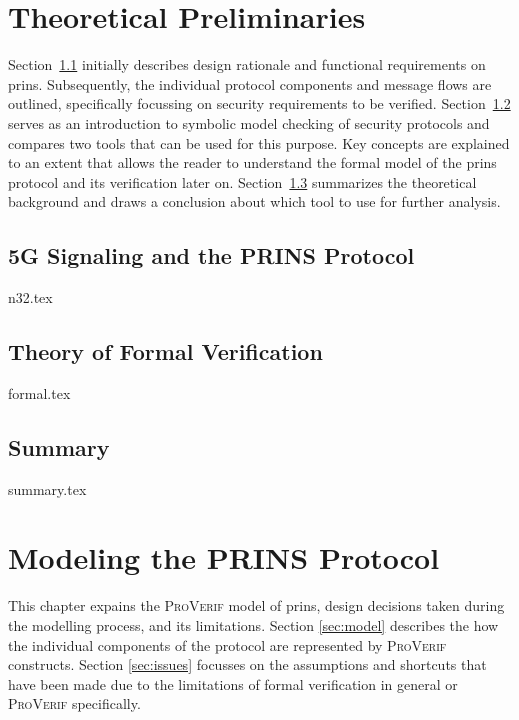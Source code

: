 \documentclass[a4paper,12pt,twoside]{report}
\begin{document}
\clearpage

\chapter{Theoretical Preliminaries}
\label{chap:theory}

Section~\ref{sec:n32} initially describes design rationale and functional requirements on \gls{prins}.
Subsequently, the individual protocol components and message flows are outlined, specifically focussing on security requirements to be verified.
Section~\ref{sec:formal} serves as an introduction to symbolic model checking of security protocols and compares two tools that can be used for this purpose.
Key concepts are explained to an extent that allows the reader to understand the formal model of the \gls{prins} protocol and its verification later on.
Section~\ref{sec:summary} summarizes the theoretical background and draws a conclusion about which tool to use for further analysis.

\section{5G Signaling and the PRINS Protocol}
\label{sec:n32}
{n32.tex}

\section{Theory of Formal Verification}
\label{sec:formal}
{formal.tex}

\section{Summary}
\label{sec:summary}
{summary.tex}

\clearpage

\chapter{Modeling the PRINS Protocol}
\label{chap:modeling}

This chapter expains the \textsc{ProVerif} model of \gls{prins}, design decisions taken during the modelling process, and its limitations.
Section \ref{sec:model} describes the how the individual components of the protocol are represented by \textsc{ProVerif} constructs.
Section \ref{sec:issues} focusses on the assumptions and shortcuts that have been made due to the limitations of formal verification in general or \textsc{ProVerif} specifically.
\end{document}
